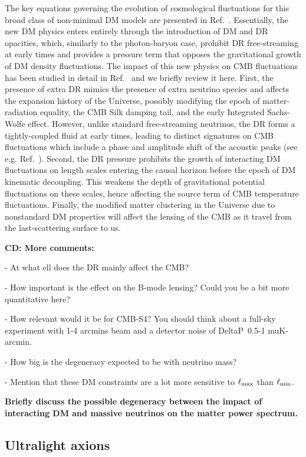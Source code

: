 The key equations governing the evolution of cosmological fluctuations for this broad class of non-minimal DM models are presented in Ref.~\cite{Cyr-Racine:2015ihg}. Essentially, the new DM physics enters entirely through the introduction of DM and DR opacities, which, similarly to the photon-baryon case, prohibit DR free-streaming at early times and provides a pressure term that opposes the gravitational growth of DM density fluctuations. The impact of this new physics on CMB fluctuations has been studied in detail in Ref.~\cite{Cyr-Racine:2013fsa} and we briefly review it here. First, the presence of extra DR mimics the presence of extra neutrino species and affects the expansion history of the Universe, possibly modifying the epoch of matter-radiation equality, the CMB Silk damping tail, and the early Integrated Sachs-Wolfe effect. However, unlike standard free-streaming neutrinos, the DR forms a tightly-coupled fluid at early times, leading to distinct signatures on CMB fluctuations which include a phase and amplitude shift of the acoustic peaks (see e.g. Ref.~\cite{Bashinsky:2003tk,Cyr-Racine:2013jua,Follin:2015hya}). Second, the DR pressure prohibits the growth of interacting DM fluctuations on length scales entering the causal horizon before the epoch of DM kinematic decoupling. This weakens the depth of gravitational potential fluctuations on these scales, hence affecting the source term of CMB temperature fluctuations. Finally, the modified matter clustering in the Universe due to nonstandard DM properties will affect the lensing of the CMB as it travel from the last-scattering surface to us.

{\bf CD: More comments:

- At what ell does the DR mainly affect the CMB?

- How important is the effect on the B-mode lensing? Could you be a bit more quantitative here?

- How relevant would it be for CMB-S4? You should think about a full-sky experiment with 1-4 arcmins beam and a detector noise of DeltaP~0.5-1 muK-arcmin.

- How big is the degeneracy expected to be with neutrino mass?

- Mention that these DM constraints are a lot more sensitive to $\ell_{\rm max}$ than $\ell_{\rm min}$.}

{\bf Briefly discuss the possible degeneracy between the impact of interacting DM and massive neutrinos on the matter power spectrum.}

\subsection{Ultralight axions}


